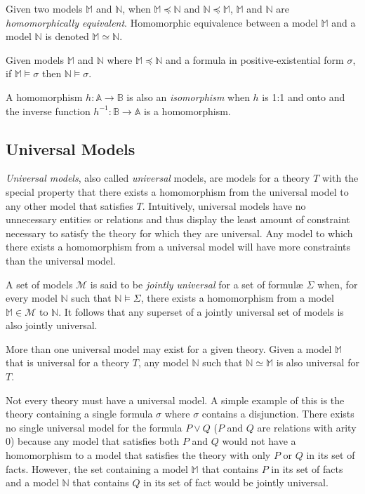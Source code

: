 		Given two models $\mathbb{M}$ and $\mathbb{N}$, when $\mathbb{M}
		\preceq \mathbb{N}$ and $\mathbb{N} \preceq \mathbb{M}$, $\mathbb{M}$
		and $\mathbb{N}$ are \emph{homomorphically equivalent}. Homomorphic
		equivalence between a model $\mathbb{M}$ and a model $\mathbb{N}$ is
		denoted $\mathbb{M} \simeq \mathbb{N}$.

		Given models $\mathbb{M}$ and $\mathbb{N}$ where $\mathbb{M} \preceq
		\mathbb{N}$ and a formula in positive-existential form $\sigma$, if
		$\mathbb{M} \models \sigma$ then $\mathbb{N} \models \sigma$.

		A homomorphism $h : \mathbb{A} \to \mathbb{B}$ is also an
		\emph{isomorphism} when $h$ is 1:1 and onto and the inverse function
		$h^{-1} : \mathbb{B} \to \mathbb{A}$ is a homomorphism.

	\subsection{Universal Models}
	\label{sec:technical_background.universal_models}

		\emph{Universal models}, also called \emph{universal} models, are models
		for a theory $T$ with the special property that there exists a
		homomorphism from the universal model to any other model that satisfies
		$T$. Intuitively, universal models have no unnecessary entities or
		relations and thus display the least amount of constraint necessary to
		satisfy the theory for which they are universal. Any model to which there
		exists a homomorphism from a universal model will have more constraints
		than the universal model.

		A set of models $\mathcal{M}$ is said to be \emph{jointly universal} for
		a set of formul{\ae} $\Sigma$ when, for every model $\mathbb{N}$ such
		that $\mathbb{N} \models \Sigma$, there exists a homomorphism from a
		model $\mathbb{M} \in \mathcal{M}$ to $\mathbb{N}$. It follows that any
		superset of a jointly universal set of models is also jointly universal.

		More than one universal model may exist for a given theory. Given a model
		$\mathbb{M}$ that is universal for a theory $T$, any model $\mathbb{N}$
		such that $\mathbb{N} \simeq \mathbb{M}$ is also universal for $T$.

		Not every theory must have a universal model. A simple example of this is
		the theory containing a single formula $\sigma$ where $\sigma$ contains
		a disjunction. There exists no single universal model for the formula $P
		\vee Q$ ($P$ and $Q$ are relations with arity $0$) because any model that
		satisfies both $P$ and $Q$ would not have a homomorphism to a model
		that satisfies the theory with only $P$ or $Q$ in its set of facts.
		However, the set containing a model $\mathbb{M}$ that contains $P$ in
		its set of facts and a model $\mathbb{N}$ that contains $Q$ in its
		set of fact would be jointly universal.

